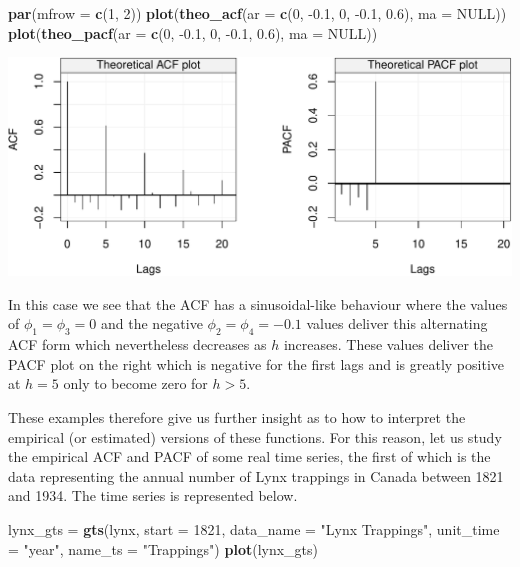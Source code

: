 \documentclass[]{book}
\newenvironment{Shaded}{\begin{snugshade}}{\end{snugshade}}
\newcommand{\DataTypeTok}[1]{\textcolor[rgb]{0.13,0.29,0.53}{#1}}
\newcommand{\DecValTok}[1]{\textcolor[rgb]{0.00,0.00,0.81}{#1}}
\newcommand{\FloatTok}[1]{\textcolor[rgb]{0.00,0.00,0.81}{#1}}
\newcommand{\KeywordTok}[1]{\textcolor[rgb]{0.13,0.29,0.53}{\textbf{#1}}}
\newcommand{\NormalTok}[1]{#1}
\newcommand{\OtherTok}[1]{\textcolor[rgb]{0.56,0.35,0.01}{#1}}
\newcommand{\StringTok}[1]{\textcolor[rgb]{0.31,0.60,0.02}{#1}}
\theoremstyle{definition}
\theoremstyle{definition}
\theoremstyle{definition}
\theoremstyle{remark}
\begin{document}
\begin{Shaded}
\begin{Highlighting}[]
\KeywordTok{par}\NormalTok{(}\DataTypeTok{mfrow =} \KeywordTok{c}\NormalTok{(}\DecValTok{1}\NormalTok{, }\DecValTok{2}\NormalTok{))}
\KeywordTok{plot}\NormalTok{(}\KeywordTok{theo_acf}\NormalTok{(}\DataTypeTok{ar =} \KeywordTok{c}\NormalTok{(}\DecValTok{0}\NormalTok{, }\FloatTok{-0.1}\NormalTok{, }\DecValTok{0}\NormalTok{, }\FloatTok{-0.1}\NormalTok{, }\FloatTok{0.6}\NormalTok{), }\DataTypeTok{ma =} \OtherTok{NULL}\NormalTok{))}
\KeywordTok{plot}\NormalTok{(}\KeywordTok{theo_pacf}\NormalTok{(}\DataTypeTok{ar =} \KeywordTok{c}\NormalTok{(}\DecValTok{0}\NormalTok{, }\FloatTok{-0.1}\NormalTok{, }\DecValTok{0}\NormalTok{, }\FloatTok{-0.1}\NormalTok{, }\FloatTok{0.6}\NormalTok{), }\DataTypeTok{ma =} \OtherTok{NULL}\NormalTok{))}
\end{Highlighting}
\end{Shaded}

\includegraphics{ts_files/figure-latex/unnamed-chunk-44-1.pdf}

In this case we see that the ACF has a sinusoidal-like behaviour where
the values of \(\phi_1 = \phi_3 = 0\) and the negative
\(\phi_2 = \phi_4 = -0.1\) values deliver this alternating ACF form
which nevertheless decreases as \(h\) increases. These values deliver
the PACF plot on the right which is negative for the first lags and is
greatly positive at \(h=5\) only to become zero for \(h > 5\).

These examples therefore give us further insight as to how to interpret
the empirical (or estimated) versions of these functions. For this
reason, let us study the empirical ACF and PACF of some real time
series, the first of which is the data representing the annual number of
Lynx trappings in Canada between 1821 and 1934. The time series is
represented below.

\begin{Shaded}
\begin{Highlighting}[]
\NormalTok{lynx_gts =}\StringTok{ }\KeywordTok{gts}\NormalTok{(lynx, }\DataTypeTok{start =} \DecValTok{1821}\NormalTok{, }\DataTypeTok{data_name =} \StringTok{"Lynx Trappings"}\NormalTok{, }\DataTypeTok{unit_time =} \StringTok{"year"}\NormalTok{, }\DataTypeTok{name_ts =} \StringTok{"Trappings"}\NormalTok{)}
\KeywordTok{plot}\NormalTok{(lynx_gts)}
\end{Highlighting}
\end{Shaded}
\end{document}
